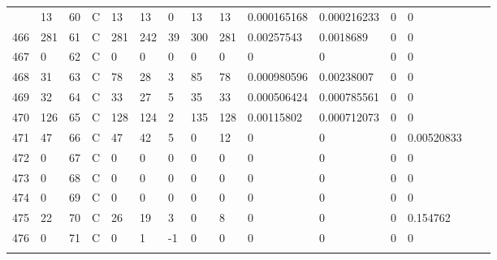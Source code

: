 \begin{longtable}{lllllllllllllll}
\begin{comment}
	465 & 13                & 60  & C   & 13                & 13                & 0                 & 13   & 13         & 0.000165168    & 0.000216233    & 0             & 0            \\
	466 & 281               & 61  & C   & 281               & 242               & 39                & 300  & 281        & 0.00257543     & 0.0018689      & 0             & 0            \\
	467 & 0                 & 62  & C   & 0                 & 0                 & 0                 & 0    & 0          & 0              & 0              & 0             & 0            \\
	468 & 31                & 63  & C   & 78                & 28                & 3                 & 85   & 78         & 0.000980596    & 0.00238007     & 0             & 0            \\
	469 & 32                & 64  & C   & 33                & 27                & 5                 & 35   & 33         & 0.000506424    & 0.000785561    & 0             & 0            \\
	470 & 126               & 65  & C   & 128               & 124               & 2                 & 135  & 128        & 0.00115802     & 0.000712073    & 0             & 0            \\
	471 & 47                & 66  & C   & 47                & 42                & 5                 & 0    & 12         & 0              & 0              & 0             & 0.00520833   \\
	472 & 0                 & 67  & C   & 0                 & 0                 & 0                 & 0    & 0          & 0              & 0              & 0             & 0            \\
	473 & 0                 & 68  & C   & 0                 & 0                 & 0                 & 0    & 0          & 0              & 0              & 0             & 0            \\
	474 & 0                 & 69  & C   & 0                 & 0                 & 0                 & 0    & 0          & 0              & 0              & 0             & 0            \\
	475 & 22                & 70  & C   & 26                & 19                & 3                 & 0    & 8          & 0              & 0              & 0             & 0.154762     \\
	476 & 0                 & 71  & C   & 0                 & 1                 & -1                & 0    & 0          & 0              & 0              & 0             & 0            \\

\end{comment}
\end{longtable}
